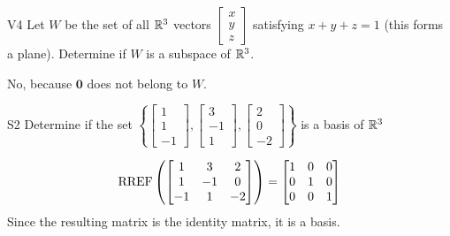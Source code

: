 \documentclass{sbgLAquiz}
\begin{document}
\begin{extract}\newpage\end{extract}
\begin{problem}{V4} Let \(W\) be the set of all \(\mathbb{R}^3\) vectors
\(\begin{bmatrix} x \\ y \\ z \end{bmatrix}\)
satisfying \(x+y+z=1\) (this forms a plane).
Determine if \(W\) is a subspace of \(\mathbb{R}^3\).
\end{problem}
\begin{solution}
No, because \(\mathbf{0}\) does not belong to \(W\).
\end{solution}


\begin{problem}{S2}
Determine if the set $\left\{\begin{bmatrix} 1 \\ 1 \\ -1 \end{bmatrix}, \begin{bmatrix} 3 \\ -1 \\ 1 \end{bmatrix},\begin{bmatrix} 2 \\ 0 \\ -2 \end{bmatrix}\right\}$ is a basis of $\mathbb{R}^3$
\end{problem}
\begin{solution}
$$\operatorname{RREF}\left(\begin{bmatrix} 1 & 3 & 2 \\ 1 & -1 & 0 \\ -1 & 1 & -2 \end{bmatrix} \right)= \begin{bmatrix} 1 & 0 &0 \\ 0 & 1 & 0 \\ 0 & 0 & 1\end{bmatrix}$$
Since the resulting matrix is the identity matrix, it is a basis.
\end{solution}
\end{document}

